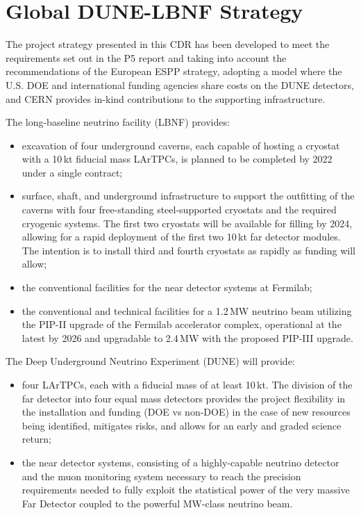 \section{Global DUNE-LBNF Strategy}

The project strategy presented in this CDR has been developed to meet the requirements 
set out in the P5 report and taking into account the recommendations of the European 
ESPP strategy, adopting a model where the U.S. DOE and international funding agencies 
share costs on the DUNE detectors, and CERN provides in-kind contributions 
to the supporting infrastructure.


The long-baseline neutrino facility (LBNF) provides:
\begin{itemize}
\item excavation of four underground caverns, each capable of hosting a cryostat 
with a 10\,kt fiducial mass LArTPCs, is planned to be completed 
by 2022 under a single contract;

\item surface, shaft, and underground infrastructure to support 
the outfitting of the caverns with four free-standing steel-supported cryostats 
and the required cryogenic systems. The first two cryostats will be available for filling by
2024, allowing for a rapid deployment of the first two 10\,kt far detector modules. 
The intention is to install third and fourth cryostats as rapidly as funding will 
allow;

\item  the conventional facilities for the near detector systems at Fermilab; 

\item  the conventional and technical facilities for a 1.2\,MW neutrino beam utilizing the PIP-II upgrade of the Fermilab accelerator 
complex, operational at the latest by 2026 and upgradable to 2.4\,MW with the proposed 
PIP-III upgrade.
\end{itemize}

The Deep Underground Neutrino Experiment (DUNE) will provide:
\begin{itemize}

\item four LArTPCs, each with a fiducial mass of at least 10\,kt. The division of 
the far detector into four equal mass detectors provides the project flexibility 
in the installation and funding (DOE vs non-DOE) in the case of new resources being 
identified, mitigates risks, and allows for an early and graded science return;

\item the near detector systems, consisting of a highly-capable neutrino detector 
and the muon monitoring system necessary to reach the precision requirements needed to fully 
exploit the statistical power of the very massive Far Detector coupled to the powerful MW-class 
neutrino beam.

\end{itemize}

